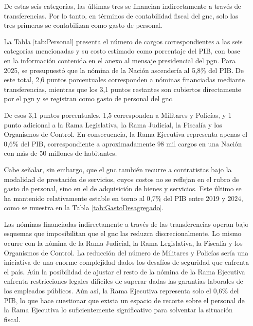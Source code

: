De estas seis categorías, las últimas tres se financian indirectamente a través de transferencias. Por lo tanto, en términos de contabilidad fiscal del \gls{gnc}, solo las tres primeras se contabilizan como gasto de personal.



La Tabla \ref{tab:Personal} presenta el número de cargos correspondientes a las seis categorías mencionadas y su costo estimado como porcentaje del PIB, con base en la información contenida en el anexo al mensaje presidencial del \gls{pgn}. Para 2025, se presupuestó que la nómina de la Nación ascendería al 5,8\% del PIB. De este total, 2,6 puntos porcentuales corresponden a nóminas financiadas mediante transferencias, mientras que los 3,1 puntos restantes son cubiertos directamente por el \gls{pgn} y se registran como gasto de personal del \gls{gnc}.

De esos 3,1 puntos porcentuales, 1,5 corresponden a Militares y Policías, y 1 punto adicional a la Rama Legislativa, la Rama Judicial, la Fiscalía y los Organismos de Control. En consecuencia, la Rama Ejecutiva representa apenas el 0,6\% del PIB, correspondiente a aproximadamente 98 mil cargos en una Nación con más de 50 millones de habitantes.

Cabe señalar, sin embargo, que el \gls{gnc} también recurre a contratistas bajo la modalidad de prestación de servicios, cuyos costos no se reflejan en el rubro de gasto de personal, sino en el de adquisición de bienes y servicios. Este último se ha mantenido relativamente estable en torno al 0,7\% del PIB entre 2019 y 2024, como se muestra en la Tabla \ref{tab:GastoDesagregado}.

Las nóminas financiadas indirectamente a través de las transferencias operan bajo esquemas que imposibilitan que el \gls{gnc} las reduzca discrecionalmente. Lo mismo ocurre con la nómina de la Rama Judicial, la Rama Legislativa, la Fiscalía y los Organismos de Control. La reducción del número de Militares y Policías sería una iniciativa de una enorme complejidad dados los desafíos de seguridad que enfrenta el país. Aún la posibilidad de ajustar el resto de la nómina de la Rama Ejecutiva enfrenta restricciones legales difíciles de superar dadas las garantías laborales de los empleados públicos. Aún así, la Rama Ejecutiva representa solo el 0,6\% del PIB, lo que hace cuestionar que exista un espacio de recorte sobre el personal de la Rama Ejecutiva lo suficientemente significativo para solventar la situación fiscal. 

